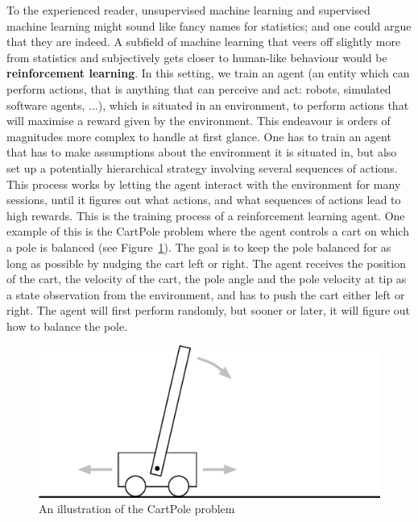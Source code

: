 To the experienced reader, unsupervised machine learning and supervised machine
learning might sound like fancy names for statistics; and one could argue that
they are indeed. A subfield of machine learning that veers off slightly more
from statistics and subjectively gets closer to human-like behaviour
would be \textbf{reinforcement learning}. In this setting, we train an agent
(an entity which can perform actions, that is anything that can perceive and
act: robots, simulated software agents, ...), 
which is situated in an environment, to perform actions that will maximise
a reward given by the environment. This endeavour is orders of magnitudes more
complex to handle at first glance. One has to train an agent that has to make
assumptions about the environment it is situated in, but also set up a
potentially hierarchical strategy involving several sequences of actions.\\

This process works by letting the agent interact with the environment for many
sessions, until it figures out what actions, and what sequences of actions lead
to high rewards. This is the training process of a reinforcement learning agent.
One example of this is the CartPole problem \cite{barto-cartpole} where the
agent controls a cart on which a pole is balanced (see
Figure~\ref{fig:cartpole_illustration}). The goal is to keep the
pole balanced for as long as possible by nudging the cart left or right. The
agent receives the position of the cart, the velocity of the cart, the pole
angle and the pole velocity at tip as a state observation from the environment,
and has to push the cart either left or right. The agent will first perform
randomly, but sooner or later, it will figure out how to balance the pole.\\

\begin{figure}
	\centering
	\includegraphics[width=0.8\linewidth]{fig/cartpole.eps}
	\caption{An illustration of the CartPole problem}
	\label{fig:cartpole_illustration}
\end{figure}

